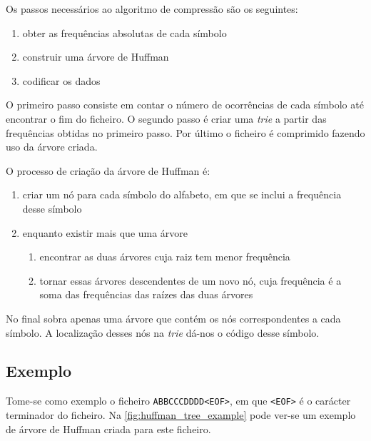 \documentclass[a4paper]{article}
\begin{document}
	Os passos necessários ao algoritmo de compressão são os seguintes:
	
	\begin{enumerate}
	\item obter as frequências absolutas de cada símbolo
	\item construir uma árvore de Huffman
	\item codificar os dados
	\end{enumerate}
	
	O primeiro passo consiste em contar o número de ocorrências de cada símbolo até encontrar o fim do ficheiro. O segundo passo é criar uma \emph{trie} a partir das frequências obtidas no primeiro passo. Por último o ficheiro é comprimido fazendo uso da árvore criada.
	
	O processo de criação da árvore de Huffman é:
	
	\begin{enumerate}
	\item criar um nó para cada símbolo do alfabeto, em que se inclui a frequência desse símbolo
	\item enquanto existir mais que uma árvore
		\begin{enumerate}
		\item encontrar as duas árvores cuja raiz tem menor frequência
		\item tornar essas árvores descendentes de um novo nó, cuja frequência é a soma das frequências das raízes das duas árvores
		\end{enumerate}
	\end{enumerate}
	
	No final sobra apenas uma árvore que contém os nós correspondentes a cada símbolo. A localização desses nós na \textit{trie} dá-nos o código desse símbolo.
	
	\subsection*{Exemplo}
	
	Tome-se como exemplo o ficheiro \texttt{ABBCCCDDDD<EOF>}, em que \texttt{<EOF>} é o carácter terminador do ficheiro. Na \autoref{fig:huffman_tree_example} pode ver-se um exemplo de árvore de Huffman criada para este ficheiro.
	
\end{document}
